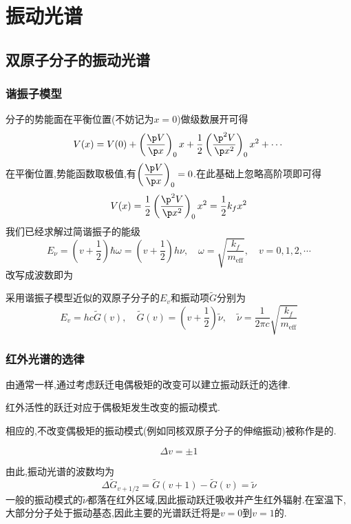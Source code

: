 \documentclass{ctexbook}
\begin{document}
\section{振动光谱}
\subsection{双原子分子的振动光谱}
\subsubsection{谐振子模型}
分子的势能面在平衡位置(不妨记为$x=0$)做级数展开可得
\[V(x)=V(0)+\left(\dfrac{\p V}{\p x}\right)_{0}x+\dfrac12\left(\dfrac{\p^2 V}{\p x^2}\right)_{0}x^2+\cdots\]
在平衡位置,势能函数取极值,有$\left(\dfrac{\p V}{\p x}\right)_{0}=0$.在此基础上忽略高阶项即可得
\[V(x)=\dfrac12\left(\dfrac{\p^2 V}{\p x^2}\right)_0x^2=\dfrac12k_fx^2\]
我们已经求解过简谐振子的能级
\[E_\nu=\left(v+\dfrac12\right)\hbar\omega=\left(v+\dfrac12\right)h\nu,\quad\omega=\sqrt{\dfrac{k_f}{m_{\text{eff}}}},\quad v=0,1,2,\cdots\]
改写成波数即为
\begin{theorem}[双原子分子的振动能级与振动项]
    采用谐振子模型近似的双原子分子的$E_v$和振动项$\tilde{G}$分别为
    \[E_v=hc\tilde{G}(v),\quad\tilde{G}(v)=\left(v+\dfrac12\right)\tilde{\nu},\quad\tilde{\nu}=\dfrac{1}{2\pi c}\sqrt{\dfrac{k_f}{m_{\text{eff}}}}\]
\end{theorem}
\subsubsection{红外光谱的选律}
由通常一样,通过考虑跃迁电偶极矩的改变可以建立振动跃迁的选律.
\begin{definition}[红外活性]
    红外活性的跃迁对应于偶极矩发生改变的振动模式.
\end{definition}
相应的,不改变偶极矩的振动模式(例如同核双原子分子的伸缩振动)被称作是的.
\begin{theorem}[谐振子模型的振动跃迁选律]
    \[\Delta v=\pm1\]
\end{theorem}
由此,振动光谱的波数均为
\[\Delta\tilde{G}_{v+1/2}=\tilde{G}(v+1)-\tilde{G}(v)=\tilde{\nu}\]
一般的振动模式的$\tilde{\nu}$都落在红外区域,因此振动跃迁吸收并产生红外辐射.在室温下,大部分分子处于振动基态,因此主要的光谱跃迁将是$v=0$到$v=1$的.
\end{document}
